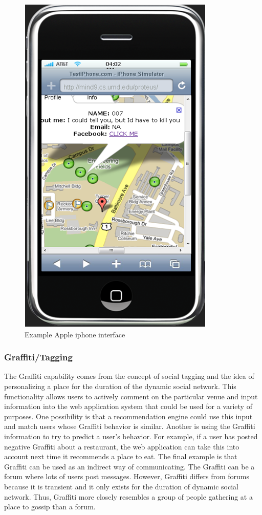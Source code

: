 \documentclass[11pt]{article}
\begin{document}
\begin{figure}[h]
\begin{center}
  \includegraphics[scale=0.5]{phoneapp.png}
\caption{Example Apple iphone interface}
\label{fig:phoneapp} 
\end{center}
\end{figure}



\subsubsection{Graffiti/Tagging}

The Graffiti capability comes from the concept of social tagging
and the idea of personalizing a place for the duration of the dynamic
social network. This functionality allows users to actively comment
on the particular venue and input information into the web
application system that could be used for a variety of purposes. One possibility is
that a recommendation engine could use this input and match users whose
Graffiti behavior is similar. Another is using the Graffiti information
to try to predict a user's behavior. For example, if a user has posted
negative Graffiti about a restaurant, the web application can take this
into account next time it recommends a place to eat. The final example
is that Graffiti can be used as an indirect way of communicating. The
Graffiti can be a forum where lots of users post messages. However,
Graffiti differs from forums because it is transient and it only exists
for the duration of dynamic social network. Thus, Graffiti more closely
resembles a group of people gathering at a place to gossip than a forum.
\end{document}
